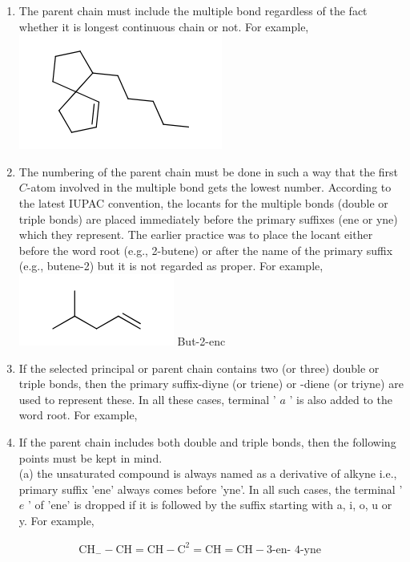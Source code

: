 \documentclass[10pt]{article}
\begin{document}
\begin{enumerate}
  \item The parent chain must include the multiple bond regardless of the fact whether it is longest continuous chain or not. For example,\\
\includegraphics{smile-af8c3e14c262b50e05b2da39caf69281e0b2f9b3}
  \item The numbering of the parent chain must be done in such a way that the first $C$-atom involved in the multiple bond gets the lowest number. According to the latest IUPAC convention, the locants for the multiple bonds (double or triple bonds) are placed immediately before the primary suffixes (ene or yne) which they represent. The earlier practice was to place the locant either before the word root (e.g., 2-butene) or after the name of the primary suffix (e.g., butene-2) but it is not regarded as proper. For example,\\
\includegraphics{smile-eaa462b167d5953ffbaa06ce124c24f34c8ddeb3} But-2-enc
  \item If the selected principal or parent chain contains two (or three) double or triple bonds, then the primary suffix-diyne (or triene) or -diene (or triyne) are used to represent these. In all these cases, terminal ' $a$ ' is also added to the word root. For example,
  \item If the parent chain includes both double and triple bonds, then the following points must be kept in mind.\\
(a) the unsaturated compound is always named as a derivative of alkyne i.e., primary suffix 'ene' always comes before 'yne'. In all such cases, the terminal ' $e$ ' of 'ene' is dropped if it is followed by the suffix starting with a, i, o, u or y. For example,
\end{enumerate}

$$
\begin{gathered}
\mathrm{CH}_{-}-\mathrm{CH}=\mathrm{CH}-\mathrm{C}^{2}=\mathrm{CH}=\mathrm{CH}-3 \text {-en- } 4 \text {-yne }
\end{gathered}
$$
\end{document}
